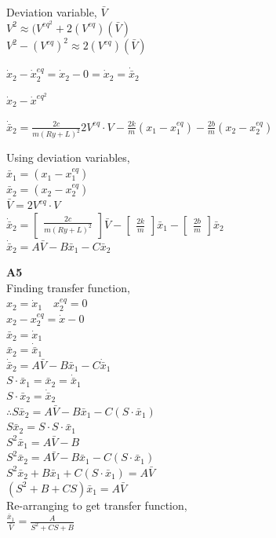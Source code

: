 Deviation variable, $\bar{V}$ \\

$V^2 \approx (V^{eq}^2 + 2(V^{eq})(\bar{V})$ \\
$V^2 - (V^{eq})^2 \approx 2(V^{eq})(\bar{V})$

$\dot x_{2} - \dot x_{2}^{eq} = \dot x_{2} - 0 = \dot x_{2} = \dot\bar x_{2}$

$\dot x_{2} - \dot x^{eq}^{2}$

 $\dot \bar x_{2} = \frac{2c}{m(Ry + L)^2}2V^{eq}\cdot V - \frac{2k}{m}(x_{1}-x_{1}^{eq}) - \frac{2b}{m} (x_{2}-x_{2}^{eq})$
 
 Using deviation variables, \\
 $\bar x_{1} = (x_{1}-x_{1}^{eq})$ \\
 $\bar x_{2} = (x_{2}-x_{2}^{eq})$  \\
 $\bar V =  2V^{eq}\cdot V$ \\
 
 $ \dot \bar x_{2} =
\begin{bmatrix}
\frac{2c}{m(Ry + L)^2} \end{bmatrix} \bar V- \begin{bmatrix}\frac{2k}{m}\end{bmatrix}\bar x_{1} - \begin{bmatrix}\frac{2b}{m}\end{bmatrix} \bar x_{2}
$ \\

 $ \dot \bar x_{2} = A \bar V - B\bar x_{1} - C\bar x_{2}$
 
\textbf{A5} \\
Finding transfer function,\\
$x_{2} = \dot x_{1} \quad x_{2}^{eq} = 0$ \\
$x_{2} - x_{2}^{eq} = \dot x - 0$ \\
$\bar x_{2} = \dot x_{1}$ \\
$\bar x_{2} = \dot \bar x_{1}$ \\
$\dot \bar x_{2} = A\bar V - B\bar x_{1} - C\dot \bar x_{1}$ \\ 
$S \cdot \bar x_{1} = \bar x_{2} = \dot \bar x_{1}$ \\ 
$S \cdot \bar x_{2} = \dot \bar x_{2}$ \\
$\therefore S\bar x_{2} =  A\bar V - B\bar x_{1} - C(S \cdot \bar x_{1})$ \\
$S \bar x_{2} = S \cdot S \cdot \bar x_{1}$ \\
$S^2 \bar x_{1} = A\bar V - B$ \\
$S^2\bar x_{2} =  A\bar V - B\bar x_{1} - C(S \cdot \bar x_{1})$ \\
$S^2\bar x_{2} + B\bar x_{1} + C(S \cdot \bar x_{1}) =  A\bar V$ \\
$(S^2 + B + CS)\bar x_{1} = A\bar V$ \\
Re-arranging to get transfer function, \\
$\frac{\bar x_{1}}{\bar V} = \frac{A}{S^2 + CS + B}$ \\